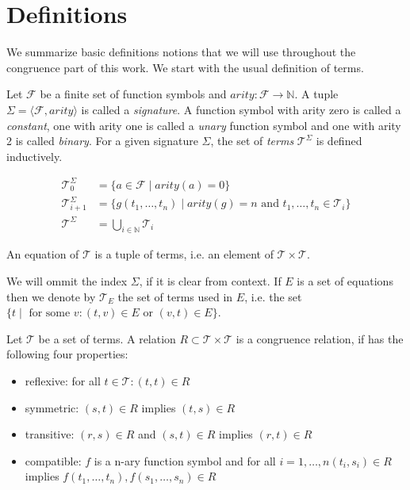 \section*{Definitions}

We summarize basic definitions notions that we will use throughout the congruence part of this work.
We start with the usual definition of terms.

\begin{definition}[Terms]

Let $\mathcal{F}$ be a finite set of function symbols and $arity: \mathcal{F} \rightarrow \mathbb{N}$.
A tuple $\Sigma = \langle \mathcal{F}, arity \rangle$ is called a \emph{signature}.
A function symbol with arity zero is called a \emph{constant}, one with arity one is called a \emph{unary} function symbol and one with arity 2 is called \emph{binary}.
For a given signature $\Sigma$, the set of \emph{terms} $\mathcal{T}^{\Sigma}$ is defined inductively.

\begin{align*}
	\mathcal{T}^{\Sigma}_0 &= \{a \in \mathcal{F} \mid arity(a) = 0\}\\
	\mathcal{T}^{\Sigma}_{i+1} &= \{g(t_1,\ldots,t_n) \mid arity(g) = n \text{ and } t_1, \ldots, t_n \in \mathcal{T}_{i}\} \\
	\mathcal{T}^{\Sigma} &= \bigcup_{i\in \mathbb{N}} \mathcal{T}_{i}
\end{align*}

An equation of $\mathcal{T}$ is a tuple of terms, i.e. an element of $\mathcal{T} \times \mathcal{T}$.

\end{definition}

We will ommit the index $\Sigma$, if it is clear from context.
If $E$ is a set of equations then we denote by $\mathcal{T}_E$ the set of terms used in $E$, i.e. the set $\{t \mid \text{ for some } v: (t,v) \in E \text{ or } (v,t) \in E\}$.

\begin{definition}

Let $\mathcal{T}$ be a set of terms.
A relation $R \subset \mathcal{T} \times \mathcal{T}$ is a congruence relation, if has the following four properties:
\begin{itemize}
	\item reflexive: for all $t \in \mathcal{T}: (t,t) \in R$
	\item symmetric: $(s,t) \in R$ implies $(t,s) \in R$
	\item transitive: $(r,s) \in R$ and $(s,t) \in R$ implies $(r,t) \in R$
	\item compatible: $f$ is a n-ary function symbol and for all $i = 1,\ldots,n (t_i,s_i) \in R$ implies $f(t_1,\ldots,t_n),f(s_1,\ldots,s_n) \in R$
\end{itemize}

\end{definition}

